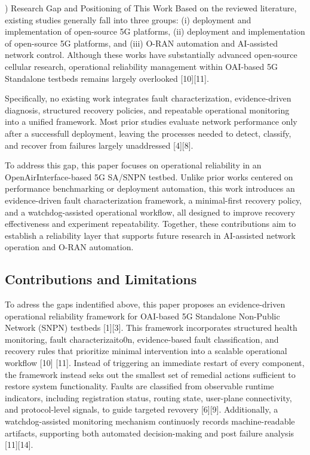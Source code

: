 \documentclass[conference]{IEEEtran}
\begin{document}
) Research Gap and Positioning of This Work
Based on the reviewed literature, existing studies generally fall into three groups: (i) deployment and implementation of open-source 5G platforms, (ii) deployment and implementation of open-source 5G platforms, and (iii) O-RAN automation and AI-assisted network control. Although these works have substantially advanced open-source cellular research, operational reliability management within OAI-based 5G Standalone testbeds remains largely overlooked [10][11].

Specifically, no existing work integrates fault characterization, evidence-driven diagnosis, structured recovery policies, and repeatable operational monitoring into a unified framework. Most prior studies evaluate network performance only after a successfull deployment, leaving the processes needed to detect, classify, and recover from failures largely unaddressed [4][8].

To address this gap, this paper focuses on operational reliability in an OpenAirInterface-based 5G SA/SNPN testbed. Unlike prior works centered on performance benchmarking or deployment automation, this work introduces an evidence-driven fault characterization framework, a minimal-first recovery policy, and a watchdog-assisted operational workflow, all designed to improve recovery effectiveness and experiment repeatability. Together, these contributions aim to establish a reliability layer that supports future research in AI-assisted network operation and O-RAN automation.

\subsection{Contributions and Limitations}
To adress the gaps indentified above, this paper proposes an evidence-driven operational reliability framework for OAI-based 5G Standalone Non-Public Network (SNPN) testbeds [1][3]. This framework incorporates structured health monitoring, fault characterizaito0n, evidence-based fault classification, and recovery rules that prioritize minimal intervention into a scalable operational workflow [10] [11]. Instead of triggering an immediate restart of every component, the framework instead seks out the smallest set of remedial actions sufficient to restore system functionality. Faults are classified from observable runtime indicators, including registration status, routing state, user-plane connectivity, and protocol-level signals, to guide targeted revovery [6][9]. Additionally, a watchdog-assisted monitoring mechanism continuosly records machine-readable artifacts, supporting both automated decision-making and post failure analysis [11][14].
\end{document}
